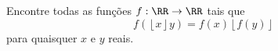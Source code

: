 Encontre todas as funções $f: \RR \to \RR$ tais que
$$ f(\left\lfloor x\right\rfloor y)=f(x)\left\lfloor f(y)\right\rfloor $$
para quaisquer $x$ e $y$ reais.
